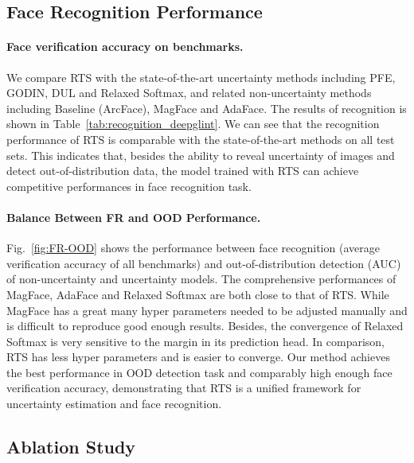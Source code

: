 \documentclass[letterpaper]{article} %
\begin{document}
\vspace{-2.86mm}
\subsection{Face Recognition Performance}
\label{ssec:face recognition}
\paragraph{Face verification accuracy on benchmarks.} We compare RTS with the state-of-the-art uncertainty methods including PFE, GODIN, DUL and Relaxed Softmax, and related non-uncertainty methods including Baseline (ArcFace), MagFace and AdaFace.
The results of recognition is shown in Table~\ref{tab:recognition_deepglint}. We can see that the recognition performance of RTS is comparable with the state-of-the-art methods on all test sets. This indicates that, besides the ability to reveal uncertainty of images and detect out-of-distribution data, the model trained with RTS can achieve competitive performances in face recognition task.

\paragraph{Balance Between FR and OOD Performance. } Fig.~\ref{fig:FR-OOD} shows the performance between face recognition (average verification accuracy of all benchmarks) and out-of-distribution detection (AUC) of non-uncertainty and uncertainty models. The comprehensive performances of MagFace, AdaFace and Relaxed Softmax are both close to that of RTS. While MagFace has a great many hyper parameters needed to be adjusted manually and is difficult to reproduce good enough results. Besides, the convergence of Relaxed Softmax is very sensitive to the margin in its prediction head. In comparison, RTS has less hyper parameters and is easier to converge. Our method achieves the best performance in OOD detection task and comparably high enough face verification accuracy, demonstrating that RTS is a unified framework for uncertainty estimation and face recognition.










\vspace{-3.29mm}
\subsection{Ablation Study}
\label{ssec:ablation}
\end{document}
